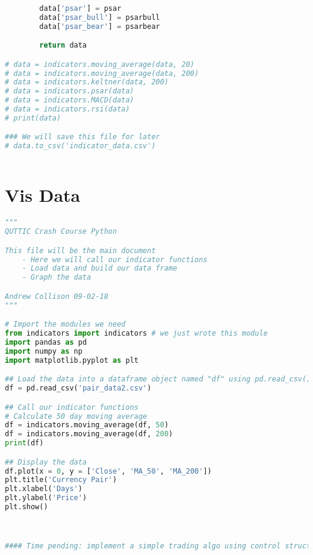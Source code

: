 \documentclass[11pt]{report}
\begin{document}
\begin{lstlisting}[language = python]
        
        data['psar'] = psar
        data['psar_bull'] = psarbull
        data['psar_bear'] = psarbear

        return data

# data = indicators.moving_average(data, 20)
# data = indicators.moving_average(data, 200)
# data = indicators.keltner(data, 200)
# data = indicators.psar(data)
# data = indicators.MACD(data)
# data = indicators.rsi(data)
# print(data)

### We will save this file for later
# data.to_csv('indicator_data.csv') 
    
\end{lstlisting}

\clearpage

\section{Vis Data}
\begin{lstlisting}[language = python]
"""
QUTTIC Crash Course Python

This file will be the main document
    - Here we will call our indicator functions
    - Load data and build our data frame
    - Graph the data

Andrew Collison 09-02-18
"""

# Import the modules we need
from indicators import indicators # we just wrote this module
import pandas as pd
import numpy as np
import matplotlib.pyplot as plt

## Load the data into a dataframe object named "df" using pd.read_csv()
df = pd.read_csv('pair_data2.csv')

## Call our indicator functions
# Calculate 50 day moving average
df = indicators.moving_average(df, 50)
df = indicators.moving_average(df, 200)
print(df)

## Display the data
df.plot(x = 0, y = ['Close', 'MA_50', 'MA_200'])
plt.title('Currency Pair')
plt.xlabel('Days')
plt.ylabel('Price')
plt.show()



#### Time pending: implement a simple trading algo using control structure


\end{lstlisting}

\clearpage
\end{document}
